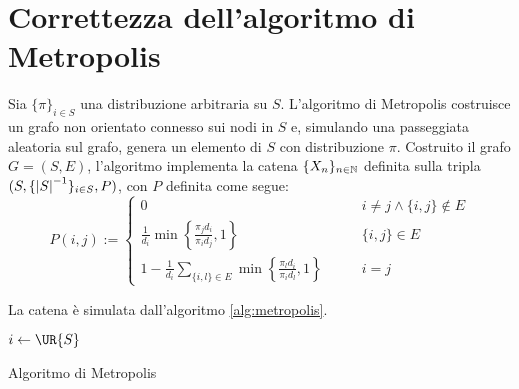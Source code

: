 %
%
%
%


\section{Correttezza dell'algoritmo di Metropolis}

Sia $\{\pi\}_{i\in S}$ una distribuzione arbitraria su $S$. L'algoritmo di Metropolis costruisce un grafo non orientato connesso sui nodi in $S$ e, simulando una passeggiata aleatoria sul grafo, genera un elemento di $S$ con distribuzione $\pi$.
Costruito il grafo $G=(S,E)$, l'algoritmo implementa la catena $\{X_n\}_{n\in\mathbb N}$ definita sulla tripla $(S,\{\left|S\right|^{-1}\}_{i\in S},P)$, con $P$ definita come segue:
\begin{equation*}
	P(i,j):=\begin{cases}
		0                                                                                                    & \qquad i\ne j\land \{i,j\}\notin E \\[1ex]
		\displaystyle \frac{1}{d_i} \min\left\{\frac{\pi_j d_i}{\pi_i d_j},1\right\}                         & \qquad \{i,j\}\in E                \\[2ex]
		\displaystyle 1 - \frac{1}{d_i} \sum_{\{i,l\}\in E} \min\left\{\frac{\pi_l d_i}{\pi_i d_l},1\right\} & \qquad i=j
	\end{cases}
\end{equation*}

La catena è simulata dall'algoritmo \ref{alg:metropolis}.
\begin{algorithm}
	\DontPrintSemicolon

	$i\asn\UR{S}$ \;

	 \;

	\caption{Algoritmo di Metropolis}
	\label{alg:metropolis}
\end{algorithm}

